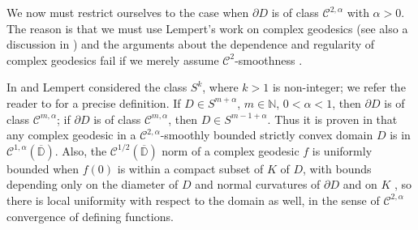 \documentclass[a4paper,12pt]{amsart}
\theoremstyle{remark}\newtheorem{remark}[theorem]{Remark}
\begin{document}



\medskip


We now must
restrict ourselves to the case when $\partial D$ is of class $\mathcal C^{2,\alpha}$ with
$\alpha>0$. The reason is that we must use Lempert's work on complex geodesics \cite{L1, L3, L4}
(see also a discussion in \cite[Remark B]{H3})
and the arguments about the dependence and regularity of complex geodesics 
 fail if we merely assume $\mathcal C^2$-smoothness \cite[remark after the Main Theorem, p. 561]{L3}. 

In \cite{L3} and \cite{L4} Lempert considered the class $S^k$, where $k>1$ is non-integer; we refer the reader to \cite[p. 561]{L3} for a precise definition. If $D\in S^{m+\alpha}$, $m\in\mathbb N$, $0<\alpha<1$,
then $\partial D$ is of class $\mathcal C^{m,\alpha}$;
if $\partial D$ is of class $\mathcal C^{m,\alpha}$, then  $D\in S^{m-1+\alpha}$. 
Thus it is proven in \cite[Corollary 3.3]{L3} that any complex geodesic in a $\mathcal C^{2,\alpha}$-smoothly bounded strictly convex domain $D$ is in $\mathcal C^{1,\alpha}(\overline{\mathbb D})$. 
Also, the $\mathcal C^{1/2}(\overline{\mathbb D})$ norm of a complex geodesic $f$ is uniformly bounded when $f(0)$ is within a compact subset of $K$ of $D$, with bounds depending only on the diameter of $D$ and
normal curvatures of $\partial D$ and on $K$ \cite[Proposition 13]{L1}, so there is local uniformity with respect to the domain as well, in the sense of $\mathcal C^{2,\alpha}$ convergence of defining functions. 
\end{document}
